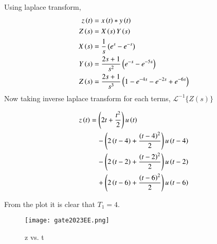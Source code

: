 \documentclass[a4,12pt,twocolumn]{IEEEtran}
\begin{document}
\solution

Using laplace transform,
\begin{align}
z\left(t\right) &=x\left(t\right)*y\left(t\right) \\
Z\left(s\right) &=X\left(s\right)Y\left(s\right) \\
X\left(s\right) &= \frac{1}{s} \left(e^{s}-e^{-s}\right) \\
Y\left(s\right) &= \frac{2s+1}{s^2} \left(e^{-s}-e^{-5s}\right)\\
Z\left(s\right) &= \frac{2s+1}{s^3} \left(1-e^{-4s}-e^{-2s}+e^{-6s}\right)
\end{align}
Now taking inverse laplace transform for each terms, $\mathscr{L^{-1}} \{Z(s)\}$
\begin{multicols}{2}
\begin{align}
z\left(t\right) &= \left(2t+\frac{t^2}{2}\right) u\left(t\right) \nonumber \\
&\quad -\left(2\left(t-4\right)+\frac{\left(t-4\right)^2}{2}\right)u\left(t-4\right) \nonumber \\
&\quad -\left(2\left(t-2\right)+\frac{\left(t-2\right)^2}{2}\right)u\left(t-2\right) \nonumber \\
&\quad +\left(2\left(t-6\right)+\frac{\left(t-6\right)^2}{2}\right)u\left(t-6\right) \nonumber
\end{align}
\end{multicols}
From the plot it is clear that $T_1=4$.
\begin{figure}[h]
\centering
   \texttt{[image: gate2023EE.png]}
   \caption{z vs. t}
   \label{fig:gate2023EE1}
 \end{figure}
\end{document}
